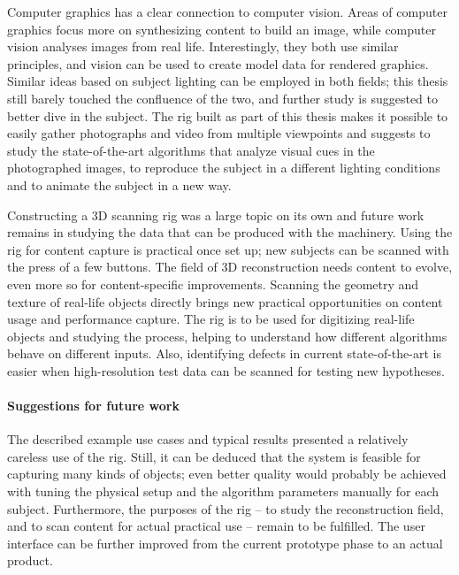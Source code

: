 Computer graphics has a clear connection to computer vision.
Areas of computer graphics focus more on synthesizing content to build an image, while computer vision analyses images from real life.
Interestingly, they both use similar principles, and vision can be used to create model data for rendered graphics.
Similar ideas based on subject lighting can be employed in both fields; this thesis still barely touched the confluence of the two, and further study is suggested to better dive in the subject.
The rig built as part of this thesis makes it possible to easily gather photographs and video from multiple viewpoints and suggests to study the state-of-the-art algorithms that analyze visual cues in the photographed images, to reproduce the subject in a different lighting conditions and to animate the subject in a new way.

Constructing a 3D scanning rig was a large topic on its own and future work remains in studying the data that can be produced with the machinery.
Using the rig for content capture is practical once set up; new subjects can be scanned with the press of a few buttons.
The field of 3D reconstruction needs content to evolve, even more so for content-specific improvements.
Scanning the geometry and texture of real-life objects directly brings new practical opportunities on content usage and performance capture.
The rig is to be used for digitizing real-life objects and studying the process, helping to understand how different algorithms behave on different inputs.
Also, identifying defects in current state-of-the-art is easier when high-resolution test data can be scanned for testing new hypotheses.


\paragraph{Suggestions for future work}
The described example use cases and typical results presented a relatively careless use of the rig.
Still, it can be deduced that the system is feasible for capturing many kinds of objects; even better quality would probably be achieved with tuning the physical setup and the algorithm parameters manually for each subject.
Furthermore, the purposes of the rig -- to study the reconstruction field, and to scan content for actual practical use -- remain to be fulfilled.
The user interface can be further improved from the current prototype phase to an actual product.


